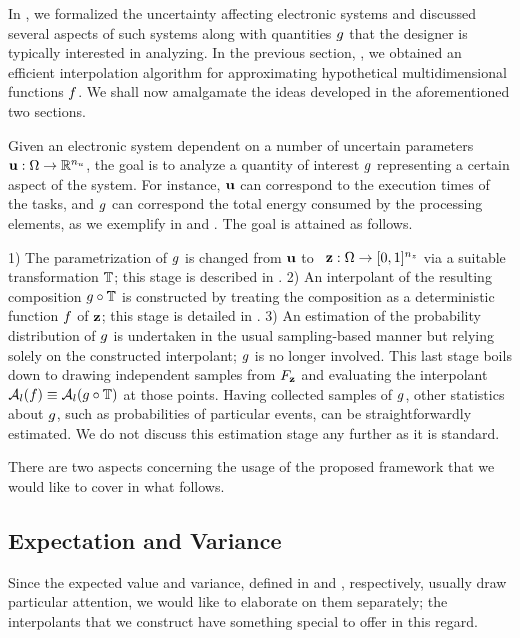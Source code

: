 In , we formalized the uncertainty affecting electronic systems
and discussed several aspects of such systems along with quantities $g$ that
the designer is typically interested in analyzing. In the previous section,
, we obtained an efficient interpolation algorithm for
approximating hypothetical multidimensional functions $f$. We shall now
amalgamate the ideas developed in the aforementioned two sections.

Given an electronic system dependent on a number of uncertain parameters $\mathbf{u}:
\Omega \to \mathbb{R}^{n_u}$, the goal is to analyze a quantity of interest $g$
representing a certain aspect of the system. For instance, $\mathbf{u}$ can correspond
to the execution times of the tasks, and $g$ can correspond the total energy
consumed by the processing elements, as we exemplify in  and
. The goal is attained as follows.

1) The parametrization of $g$ is changed from $\mathbf{u}$ to \rvs\ $\mathbf{z}: \Omega
\to [0, 1]^{n_z}$ via a suitable transformation $\mathbb{T}$; this stage is
described in . 2) An interpolant of the resulting composition
$g \circ \mathbb{T}$ is constructed by treating the composition as a
deterministic function $f$ of $\mathbf{z}$; this stage is detailed in
. 3) An estimation of the probability distribution of $g$
is undertaken in the usual sampling-based manner but relying solely on the
constructed interpolant; $g$ is no longer involved. This last stage boils down
to drawing independent samples from $F_{\mathbf{z}}$ and evaluating the
interpolant $\mathcal{A}_{l}(f) \equiv \mathcal{A}_{l}(g \circ
\mathbb{T})$ at those points. Having collected samples of $g$, other
statistics about $g$, such as probabilities of particular events, can be
straightforwardly estimated. We do not discuss this estimation stage any further
as it is standard.

There are two aspects concerning the usage of the proposed framework that we
would like to cover in what follows.

\subsection{Expectation and Variance} 
Since the expected value and variance, defined in  and
, respectively, usually draw particular attention, we would like
to elaborate on them separately; the interpolants that we construct have
something special to offer in this regard.

